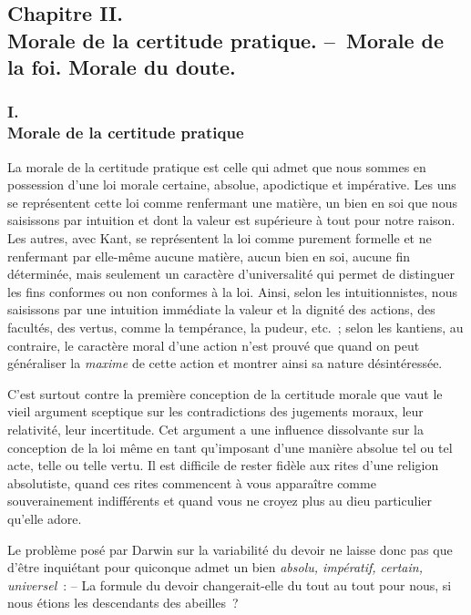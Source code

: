 \documentclass[french,twoside]{book} %
\begin{document}
\subsection[{Chapitre II. Morale de la certitude pratique. – Morale de la foi. Morale du doute.}]{Chapitre II. \\
Morale de la certitude pratique. – Morale de la foi. Morale du doute.}
\subsubsection[{I. Morale de la certitude pratique}]{I. \\
Morale de la certitude pratique}
\noindent La morale de la certitude pratique est celle qui admet que nous sommes en possession d’une loi morale certaine, absolue, apodictique et impérative. Les uns se représentent cette loi comme renfermant une matière, un bien en soi que nous saisissons par intuition et dont la valeur est supérieure à tout pour notre raison. Les autres, avec Kant, se représentent la loi comme purement formelle et ne renfermant par elle-même aucune matière, aucun bien en soi, aucune fin déterminée, mais seulement un caractère d’universalité qui permet de distinguer les fins conformes ou non conformes à la loi. Ainsi, selon les intuitionnistes, nous saisissons par une intuition immédiate la valeur et la dignité des actions, des facultés, des vertus, comme la tempérance, la pudeur, etc. ; selon les kantiens, au contraire, le caractère moral d’une action n’est prouvé que quand on peut généraliser la \emph{maxime} de cette action et montrer ainsi sa nature désintéressée.\par
C’est surtout contre la première conception de la certitude morale que vaut le vieil argument sceptique sur les contradictions des jugements moraux, leur relativité, leur incertitude. Cet argument a une influence dissolvante sur la conception de la loi même en tant qu’imposant d’une manière absolue tel ou tel acte, telle ou telle vertu. Il est difficile de rester fidèle aux rites d’une religion absolutiste, quand ces rites commencent à vous apparaître comme souverainement indifférents et quand vous ne croyez plus au dieu particulier qu’elle adore.\par
Le problème posé par Darwin sur la variabilité du devoir ne laisse donc pas que d’être inquiétant pour quiconque admet un bien \emph{absolu, impératif, certain, universel} : – La formule du devoir changerait-elle du tout au tout pour nous, si nous étions les descendants des abeilles ?\par
\end{document}
